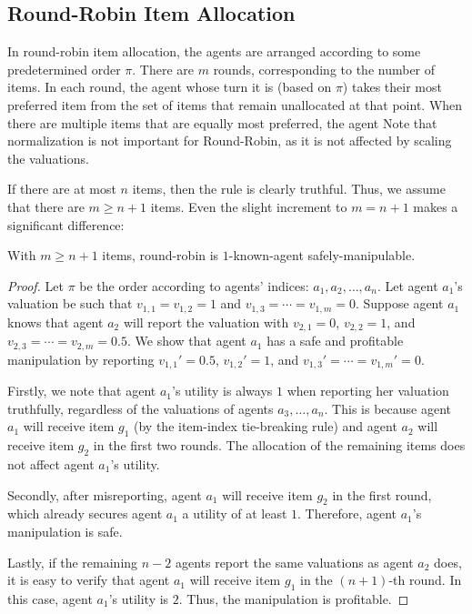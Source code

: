 \subsection{Round-Robin Item Allocation}
In round-robin item allocation, the agents are arranged according to some predetermined order $\pi$. 
There are $m$ rounds, corresponding to the number of items. 
In each round, the agent whose turn it is (based on $\pi$) takes their most preferred item from the set of items that remain unallocated at that point.
When there are multiple items that are equally most preferred, the agent 
Note that normalization is not important for Round-Robin, as it is not affected by scaling the valuations.

If there are at most $n$ items, then the rule is clearly truthful.
Thus, we assume that there are $m\geq n+1$ items.
Even the slight increment to $m=n+1$ makes a significant difference:

\begin{lemma}\label{claim:RR-RAT1-tie}
    With $m\geq n+1$ items, round-robin  is $1$-known-agent safely-manipulable.
\end{lemma}

\begin{proof}
    Let $\pi$ be the order according to agents' indices: $a_1,a_2,\ldots,a_n$.
    Let agent $a_1$'s valuation be such that $v_{1,1}=v_{1,2}=1$ and $v_{1,3}=\cdots = v_{1,m}=0$.
    Suppose agent $a_1$ knows that agent $a_2$ will report the valuation with $v_{2,1}=0$, $v_{2,2}=1$, and $v_{2,3}=\cdots=v_{2,m}=0.5$.
    We show that agent $a_1$ has a safe and profitable manipulation by reporting $v_{1,1}'=0.5$, $v_{1,2}'=1$, and $v_{1,3}'=\cdots=v_{1,m}'=0$.

    Firstly, we note that agent $a_1$'s utility is always $1$ when reporting her valuation truthfully, regardless of the valuations of agents $a_3,\ldots,a_n$.
    This is because agent $a_1$ will receive item $g_1$ (by the item-index tie-breaking rule) and agent $a_2$ will receive item $g_2$ in the first two rounds.
    The allocation of the remaining items does not affect agent $a_1$'s utility.

    Secondly, after misreporting, agent $a_1$ will receive item $g_2$ in the first round, which already secures agent $a_1$ a utility of at least $1$. Therefore, agent $a_1$'s manipulation is safe.

    Lastly, if the remaining $n-2$ agents report the same valuations as agent $a_2$ does, it is easy to verify that agent $a_1$ will receive item $g_1$ in the $(n+1)$-th round.
    In this case, agent $a_1$'s utility is $2$.
    Thus, the manipulation is profitable.
\end{proof}

